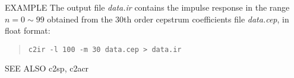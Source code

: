 \begin{options}
\end{options}

\begin{qsection}{EXAMPLE}
The output file {\em data.ir} contains the impulse response
in the range $n = 0 \sim 99$ obtained from the 30th order cepstrum
coefficients file {\em data.cep}, in float format:
 \begin{quote}
  \verb!c2ir -l 100 -m 30 data.cep > data.ir!
 \end{quote}
\end{qsection}

\begin{qsection}{SEE ALSO}
 c2sp, c2acr
\end{qsection}
